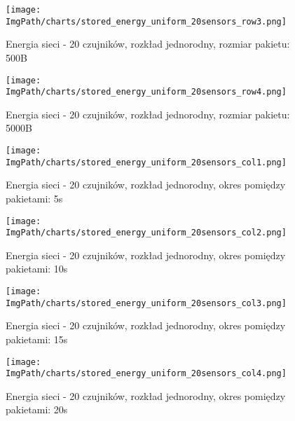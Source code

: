 \documentclass[a4paper,12pt,twoside,openany]{report}
\newcommand{\ImgPath}{./img}
\begin{document}
\begin{figure}[H]
	\begin{center}
		\texttt{[image: \\ImgPath/charts/stored\_energy\_uniform\_20sensors\_row3.png]}
	\end{center}
	\caption{Energia sieci - 20 czujników, rozkład jednorodny, rozmiar pakietu: 500B}
\end{figure}

\begin{figure}[H]
	\begin{center}
		\texttt{[image: \\ImgPath/charts/stored\_energy\_uniform\_20sensors\_row4.png]}
	\end{center}
	\caption{Energia sieci - 20 czujników, rozkład jednorodny, rozmiar pakietu: 5000B}
\end{figure}

\begin{figure}[H]
	\begin{center}
		\texttt{[image: \\ImgPath/charts/stored\_energy\_uniform\_20sensors\_col1.png]}
	\end{center}
	\caption{Energia sieci - 20 czujników, rozkład jednorodny, okres pomiędzy pakietami: 5s}
\end{figure}

\begin{figure}[H]
	\begin{center}
		\texttt{[image: \\ImgPath/charts/stored\_energy\_uniform\_20sensors\_col2.png]}
	\end{center}
	\caption{Energia sieci - 20 czujników, rozkład jednorodny, okres pomiędzy pakietami: 10s}
\end{figure}

\begin{figure}[H]
	\begin{center}
		\texttt{[image: \\ImgPath/charts/stored\_energy\_uniform\_20sensors\_col3.png]}
	\end{center}
	\caption{Energia sieci - 20 czujników, rozkład jednorodny, okres pomiędzy pakietami: 15s}
\end{figure}

\begin{figure}[H]
	\begin{center}
		\texttt{[image: \\ImgPath/charts/stored\_energy\_uniform\_20sensors\_col4.png]}
	\end{center}
	\caption{Energia sieci - 20 czujników, rozkład jednorodny, okres pomiędzy pakietami: 20s}
\end{figure}
\end{document}
